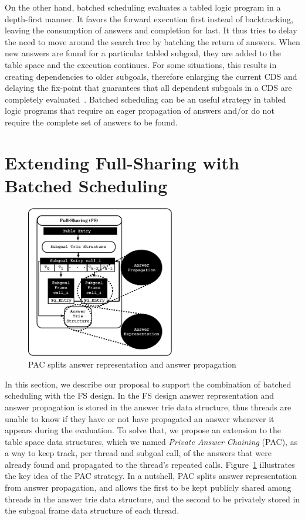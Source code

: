 \documentclass{llncs}
\begin{document}
On the other hand, batched scheduling evaluates a tabled logic program
in a depth-first manner. It favors the forward execution first instead
of backtracking, leaving the consumption of answers and completion for
last. It thus tries to delay the need to move around the search tree
by batching the return of answers. When new answers are found for a
particular tabled subgoal, they are added to the table space and the
execution continues. For some situations, this results in creating
dependencies to older subgoals, therefore enlarging the current CDS
and delaying the fix-point that guarantees that all dependent subgoals
in a CDS are completely evaluated~\cite{Sagonas-98}. Batched
scheduling can be an useful strategy in tabled logic programs that
require an eager propagation of answers and/or do not require the
complete set of answers to be found.



\section{Extending Full-Sharing with Batched Scheduling}

\begin{figure}
\vspace{-0.5\intextsep}
\centering
\includegraphics[width=6.5cm]{figures/pcc_key-idea.pdf}
\caption{PAC splits answer representation and answer propagation}
\label{fig_tabtries_pcc_key-idea}
\vspace{-0.5\intextsep}
\end{figure}

In this section, we describe our proposal to support the combination
of batched scheduling with the FS design. In the FS design answer
representation and answer propagation is stored in the answer trie
data structure, thus threads are unable to know if they have or not
have propagated an answer whenever it appears during the
evaluation. To solve that, we propose an extension to the table space
data structures, which we named \emph{Private Answer Chaining} (PAC),
as a way to keep track, per thread and subgoal call, of the answers
that were already found and propagated to the thread's repeated
calls. Figure~\ref{fig_tabtries_pcc_key-idea} illustrates the key idea
of the PAC strategy. In a nutshell, PAC splits answer representation
from answer propagation, and allows the first to be kept publicly
shared among threads in the answer trie data structure, and the second
to be privately stored in the subgoal frame data structure of each
thread.
\end{document}
